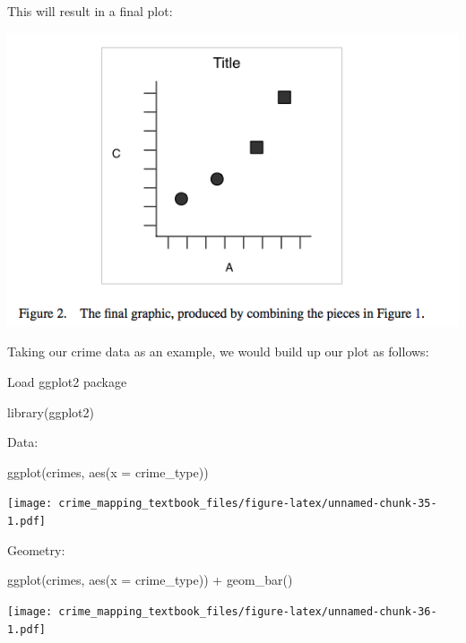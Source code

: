 \documentclass[
]{book}
\newenvironment{Shaded}{\begin{snugshade}}{\end{snugshade}}
\newcommand{\AttributeTok}[1]{\textcolor[rgb]{0.77,0.63,0.00}{#1}}
\newcommand{\FunctionTok}[1]{\textcolor[rgb]{0.00,0.00,0.00}{#1}}
\newcommand{\NormalTok}[1]{#1}
\newcommand{\SpecialCharTok}[1]{\textcolor[rgb]{0.00,0.00,0.00}{#1}}
\begin{document}
This will result in a final plot:

\includegraphics{img/combined.png}

Taking our crime data as an example, we would build up our plot as follows:

Load ggplot2 package

\begin{Shaded}
\begin{Highlighting}[]
\FunctionTok{library}\NormalTok{(ggplot2)}
\end{Highlighting}
\end{Shaded}

Data:

\begin{Shaded}
\begin{Highlighting}[]
\FunctionTok{ggplot}\NormalTok{(crimes, }\FunctionTok{aes}\NormalTok{(}\AttributeTok{x =}\NormalTok{ crime\_type))}
\end{Highlighting}
\end{Shaded}

\texttt{[image: crime\_mapping\_textbook\_files/figure-latex/unnamed-chunk-35-1.pdf]}

Geometry:

\begin{Shaded}
\begin{Highlighting}[]
\FunctionTok{ggplot}\NormalTok{(crimes, }\FunctionTok{aes}\NormalTok{(}\AttributeTok{x =}\NormalTok{ crime\_type)) }\SpecialCharTok{+} 
  \FunctionTok{geom\_bar}\NormalTok{()}
\end{Highlighting}
\end{Shaded}

\texttt{[image: crime\_mapping\_textbook\_files/figure-latex/unnamed-chunk-36-1.pdf]}
\end{document}
